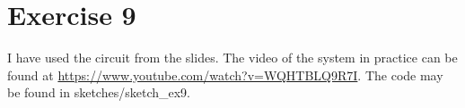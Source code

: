\part*{Exercise 9}
I have used the circuit from the slides. The video of the system in practice can be found at \url{https://www.youtube.com/watch?v=WQHTBLQ9R7I}. The code may be found in sketches/sketch\_ex9.